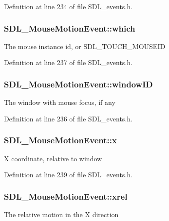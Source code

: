 Definition at line 234 of file S\-D\-L\-\_\-events.\-h.

\hypertarget{struct_s_d_l___mouse_motion_event_a6f04c17b4305683915e2fd2dc3c36dbc}{
\subsubsection[{which}]{ S\-D\-L\-\_\-\-Mouse\-Motion\-Event\-::which}}\label{struct_s_d_l___mouse_motion_event_a6f04c17b4305683915e2fd2dc3c36dbc}
The mouse instance id, or S\-D\-L\-\_\-\-T\-O\-U\-C\-H\-\_\-\-M\-O\-U\-S\-E\-I\-D 

Definition at line 237 of file S\-D\-L\-\_\-events.\-h.

\hypertarget{struct_s_d_l___mouse_motion_event_aa9976725242ada93a9e18e7fdf5796e6}{
\subsubsection[{window\-I\-D}]{ S\-D\-L\-\_\-\-Mouse\-Motion\-Event\-::window\-I\-D}}\label{struct_s_d_l___mouse_motion_event_aa9976725242ada93a9e18e7fdf5796e6}
The window with mouse focus, if any 

Definition at line 236 of file S\-D\-L\-\_\-events.\-h.

\hypertarget{struct_s_d_l___mouse_motion_event_a36398bb4a5308446a262b0bfc8baa80a}{
\subsubsection[{x}]{ S\-D\-L\-\_\-\-Mouse\-Motion\-Event\-::x}}\label{struct_s_d_l___mouse_motion_event_a36398bb4a5308446a262b0bfc8baa80a}
X coordinate, relative to window 

Definition at line 239 of file S\-D\-L\-\_\-events.\-h.

\hypertarget{struct_s_d_l___mouse_motion_event_a1c01d9aba2a20778fb45a15dca39ef58}{
\subsubsection[{xrel}]{ S\-D\-L\-\_\-\-Mouse\-Motion\-Event\-::xrel}}\label{struct_s_d_l___mouse_motion_event_a1c01d9aba2a20778fb45a15dca39ef58}
The relative motion in the X direction 

